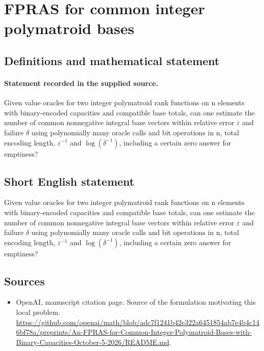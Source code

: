 \documentclass[11pt]{article}
\begin{document}
\section*{FPRAS for common integer polymatroid bases}\label{statement}
\subsection{Definitions and mathematical statement}
\paragraph{Statement recorded in the supplied source.}
Given value oracles for two integer polymatroid rank functions on n elements with binary-encoded capacities and compatible base totals, can one estimate the number of common nonnegative integral base vectors within relative error $\varepsilon $ and failure $\delta $ using polynomially many oracle calls and bit operations in n, total encoding length, $\varepsilon ^{-1}$ and $\log (\delta ^{-1})$, including a certain zero answer for emptiness?
\subsection{Short English statement}
Given value oracles for two integer polymatroid rank functions on n elements with binary-encoded capacities and compatible base totals, can one estimate the number of common nonnegative integral base vectors within relative error $\varepsilon $ and failure $\delta $ using polynomially many oracle calls and bit operations in n, total encoding length, $\varepsilon ^{-1}$ and $\log (\delta ^{-1})$, including a certain zero answer for emptiness?
\subsection{Sources}
\begin{itemize}
\item[S1] OpenAI, manuscript citation page. Source of the formulation motivating this local problem.
\url{https://github.com/openai/math/blob/adc7f1241b42e322a6451854ab7e4b4c146bf78a/preprints/An-FPRAS-for-Common-Integer-Polymatroid-Bases-with-Binary-Capacities-October-5-2026/README.md}.
\end{itemize}
\end{document}
